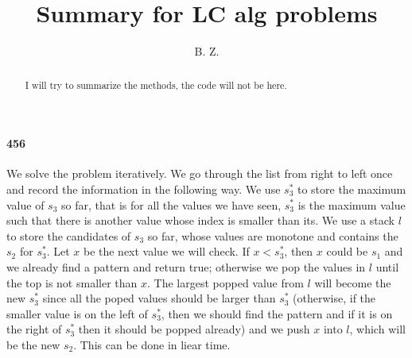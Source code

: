 \documentclass[11pt]{article}
\begin{document}
\title{
{Summary for LC alg problems}
}
\author{B. Z.}
\date{}
\maketitle
\begin{abstract}
I will try to summarize the methods, the code will not be here.
\end{abstract}

\paragraph{456}
We solve the problem iteratively. We go through the list from right to left once and record the information in the following 
way. We use $s^*_3$ to store the maximum value of $s_3$ so far, that is for all the values 
we have seen, $s^*_3$ is the maximum value such that there is another value whose index is smaller than its.
We use a stack $l$ to store the candidates of $s_3$ so far, whose values are monotone and contains the $s_2$ for $s^*_3$.
Let $x$ be the next value we will check. If $x < s^*_3$, then $x$ could be $s_1$ and we already find a 
pattern and return true; otherwise we pop the values in $l$ until the top is not smaller than $x$. The largest popped value from
$l$ will become the new $s^*_3$ since all the poped values should be larger than $s^*_3$ (otherwise, if the smaller value is 
on the left of $s^*_3$, then we should find the pattern and if it is on the right of $s^*_3$ then it should be popped already) 
and we push $x$ into $l$, which will be the new $s_2$. This can be done in liear time.
\end{document}
